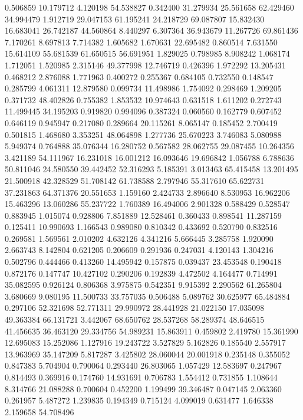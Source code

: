 0.506859
10.179712
4.120198
54.538827
0.342400
31.279934
25.561658
62.429460
34.994479
1.912719
29.047153
61.195241
24.218729
69.087807
15.832430
16.683041
26.742187
44.560864
8.440297
6.307364
36.943679
11.267726
69.861436
7.170261
8.697813
7.714382
1.605682
1.670631
22.695482
0.860514
7.631550
15.614109
55.681539
61.650515
56.691951
1.829025
0.798985
8.908242
1.068174
1.712051
1.520985
2.315146
49.377998
12.746719
0.426396
1.972292
13.205431
0.468212
2.876088
1.771963
0.400272
0.255367
0.684105
0.732550
0.148547
0.285799
4.061311
12.879580
0.099734
11.498986
1.754092
0.298469
1.209205
0.371732
48.402826
0.755382
1.853532
10.974643
0.631518
1.611202
0.272743
11.499445
34.195203
0.919820
0.994096
0.387324
0.060560
0.162779
0.607452
0.646119
0.945947
0.217080
0.289664
20.115261
8.065147
0.185452
2.700419
0.501815
1.468680
3.353251
48.064898
1.277736
25.670223
3.746083
5.080988
5.949374
0.764888
35.076344
16.280752
0.567582
28.062755
29.087455
10.264356
3.421189
54.111967
16.231018
16.001212
16.093646
19.696842
1.056788
6.788636
50.811046
24.580550
39.442452
52.316293
5.185391
3.013463
65.415458
13.201495
21.500918
42.328529
51.708142
61.738588
2.797946
55.317610
65.622731
37.231863
64.371376
20.551653
1.159160
2.424733
2.896640
8.530953
16.962206
15.463296
13.060286
55.237722
1.760389
16.494006
2.901328
0.588429
0.528547
0.883945
1.015074
0.928806
7.851889
12.528461
0.360433
0.898541
11.287159
0.125411
10.990693
1.166543
0.989080
0.810342
0.433692
0.520790
0.832516
0.269581
1.569561
2.010202
4.632126
4.341216
5.666445
3.285758
1.920090
2.663743
8.142804
0.621205
0.206609
0.291936
0.247031
4.120143
1.304216
0.502796
0.444466
0.413260
14.495942
0.157875
0.039437
23.453548
0.190418
0.872176
0.147747
10.427102
0.290206
0.192839
4.472502
4.164477
0.714991
35.082595
0.926124
0.806368
3.975875
0.542351
9.915392
2.290562
61.265804
3.680669
9.080195
11.500733
33.757035
0.506488
5.089762
30.625977
65.484884
0.297106
52.321698
52.771311
29.990972
28.441928
21.022150
17.035098
49.363384
66.131721
3.442067
68.650762
28.537268
58.289374
48.646515
41.456635
36.463120
29.334756
54.989231
15.863911
0.459802
2.419780
15.361990
12.695083
15.252086
1.127916
19.243722
3.527829
5.162826
0.185540
2.557917
13.963969
35.147209
5.817287
3.425802
28.060044
20.001918
0.235148
0.355052
0.847383
5.704904
0.790064
0.293440
26.803065
1.057429
12.583697
0.247967
0.814493
0.369916
0.174760
14.931691
0.706783
1.554412
0.731855
1.108644
8.314766
21.088288
0.700604
0.452200
1.199499
39.346487
0.047145
2.063360
0.261957
5.487272
1.239835
0.194349
0.715124
4.099019
0.631477
1.646338
2.159658
54.708496

